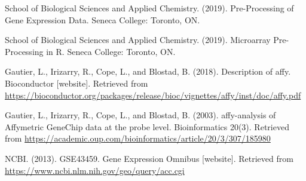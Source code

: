 \documentclass[11 pt,letterpaper]{article}
\begin{document}
\begin{thebibliography}{1}

     School of Biological Sciences and Applied Chemistry. (2019). Pre-Processing of Gene Expression Data. Seneca College: Toronto, ON.

     School of Biological Sciences and Applied Chemistry. (2019). Microarray Pre-Processing in R. Seneca College: Toronto, ON.

     Gautier, L., Irizarry, R., Cope, L., and Blostad, B. (2018). Description of affy. Bioconductor [website]. Retrieved from \url{https://bioconductor.org/packages/release/bioc/vignettes/affy/inst/doc/affy.pdf}
    
     Gautier, L., Irizarry, R., Cope, L., and Blostad, B. (2003). affy-analysis of Affymetric GeneChip data at the probe level. Bioinformatics 20(3). Retrieved from \url{https://academic.oup.com/bioinformatics/article/20/3/307/185980}

     NCBI. (2013). GSE43459. Gene Expression Omnibus [website]. Retrieved from \url{https://www.ncbi.nlm.nih.gov/geo/query/acc.cgi}

\end{thebibliography}
\end{document}
